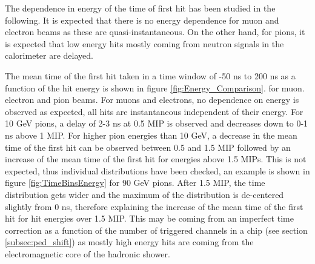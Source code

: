 The dependence in energy of the time of first hit has been studied in the following. It is expected that there is no energy dependence for muon and electron beams as these are quasi-instantaneous. On the other hand, for pions, it is expected that low energy hits mostly coming from neutron signals in the calorimeter are delayed.

The mean time of the first hit taken in a time window of -50 ns to 200 ns as a function of the hit energy is shown in figure \ref{fig:Energy_Comparison}. for muon. electron and pion beams. For muons and electrons, no dependence on energy is observed as expected, all hits are instantaneous independent of their energy. For 10 GeV pions, a delay of 2-3 ns at 0.5 MIP is observed and decreases down to 0-1 ns above 1 MIP. For higher pion energies than 10 GeV, a decrease in the mean time of the first hit can be observed between 0.5 and 1.5 MIP followed by an increase of the mean time of the first hit for energies above 1.5 MIPs. This is not expected, thus individual distributions have been checked, an example is shown in figure \ref{fig:TimeBinsEnergy} for 90 GeV pions. After 1.5 MIP, the time distribution gets wider and the maximum of the distribution is de-centered slightly from 0 ns, therefore explaining the increase of the mean time of the first hit for hit energies over 1.5 MIP. This may be coming from an imperfect time correction as a function of the number of triggered channels in a chip (see section \ref{subsec:ped_shift}) as mostly high energy hits are coming from the electromagnetic core of the hadronic shower.

